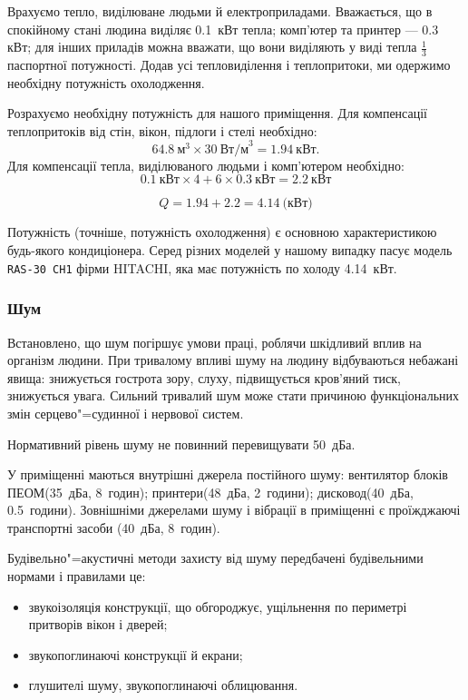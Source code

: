 \documentclass[simple,14pt,utf8,ukrainian]{eskdtext}
\begin{document}
      Врахуємо тепло, виділюване людьми й електроприладами.
      Вважається, що в спокійному стані людина виділяє \num{0.1}~кВт тепла;
      комп’ютер та принтер --- \num{0.3} кВт; для інших приладів можна
      вважати, що вони виділяють у виді тепла $\frac{1}{3}$ паспортної
      потужності.
      Додав усі тепловиділення і теплопритоки, ми одержимо необхідну
      потужність охолодження.

      Розрахуємо необхідну потужність для нашого приміщення.
      Для компенсації теплопритоків від стін, вікон, підлоги і стелі
      необхідно:\[
      64.8~\text{м}^3 \times 30~\text{Вт/м}^3 = 1.94~\text{кВт}. \]
      Для компенсації тепла, виділюваного людьми і комп’ютером необхідно:
      \[
        0.1~\text{кВт} \times 4 + 6 \times 0.3~\text{кВт}= 2.2~\text{кВт}
      \]

      \begin{equation}
        Q = 1.94 + 2.2 = 4.14~\text{(кВт)}
        \label{eq:q}
      \end{equation}

      Потужність (точніше, потужність охолодження) є основною характеристикою
      будь-якого кондиціонера.
      Серед різних моделей у нашому випадку пасує модель \texttt{RAS-30 CH1}
      фірми HITACHI, яка має потужність по холоду \num{4.14}~кВт.
    \subsubsection{Шум}
      Встановлено, що шум погіршує умови праці, роблячи шкідливий вплив на
      організм людини.
      При тривалому впливі шуму на людину відбуваються небажані явища:
      знижується гострота зору, слуху, підвищується кров’яний тиск, знижується
      увага.
      Сильний тривалий шум може стати причиною функціональних змін
      серцево"=судинної і нервової систем.

      Нормативний рівень шуму не повинний перевищувати \num{50}~дБа\cite{dsn}.

      У приміщенні маються внутрішні джерела постійного шуму: вентилятор
      блоків ПЕОМ(\num{35}~дБа, \num{8}~годин); принтери(\num{48}~дБа,
      \num{2}~години); дисковод(\num{40}~дБа, \num{0.5}~години).
      Зовнішніми джерелами шуму і вібрації в приміщенні є проїжджаючі
      транспортні засоби (\num{40}~дБа, \num{8}~годин).

      Будівельно"=акустичні методи захисту від шуму передбачені будівельними
      нормами і правилами це:
      \begin{itemize}
        \item звукоізоляція конструкції, що обгороджує, ущільнення по
          периметрі притворів вікон і дверей;
        \item звукопоглинаючі конструкції й екрани;
        \item глушителі шуму, звукопоглинаючі облицювання.
      \end{itemize}
\end{document}
